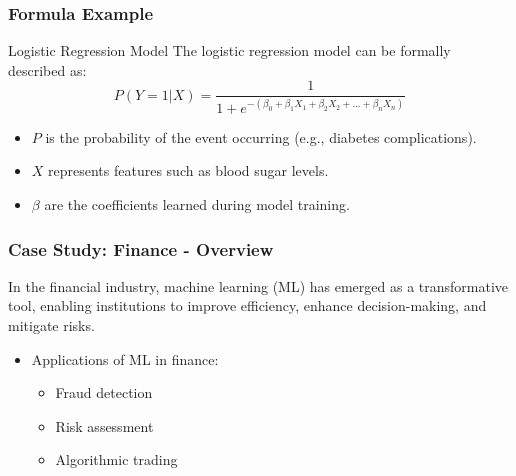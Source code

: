 \documentclass[aspectratio=169]{beamer}
\begin{document}
\begin{frame}[fragile]
    \frametitle{Formula Example}
    \begin{block}{Logistic Regression Model}
        The logistic regression model can be formally described as:
        \begin{equation} 
        P(Y=1|X) = \frac{1}{1 + e^{-(\beta_0 + \beta_1X_1 + \beta_2X_2 + ... + \beta_nX_n)}} 
        \end{equation}
        \begin{itemize}
            \item \( P \) is the probability of the event occurring (e.g., diabetes complications).
            \item \( X \) represents features such as blood sugar levels.
            \item \( \beta \) are the coefficients learned during model training.
        \end{itemize}
    \end{block}
\end{frame}

\begin{frame}
    \frametitle{Case Study: Finance - Overview}
    In the financial industry, machine learning (ML) has emerged as a transformative tool, enabling institutions to improve efficiency, enhance decision-making, and mitigate risks. 
    \begin{itemize}
        \item Applications of ML in finance:
        \begin{itemize}
            \item Fraud detection
            \item Risk assessment
            \item Algorithmic trading
        \end{itemize}
    \end{itemize}
\end{frame}
\end{document}
